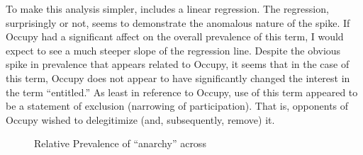 \documentclass[openany,twoside]{memoir}
\begin{document}
\begin{Spacing}{2}
To make this analysis simpler,  includes a linear regression.
The regression, surprisingly or not, seems to demonstrate the anomalous nature of the  spike.
If Occupy had a significant affect on the overall prevalence of this term, I would expect to see a much steeper slope of the regression line.
Despite the obvious spike in prevalence that appears related to Occupy, it seems that in the case of this term, Occupy does not appear to have significantly changed the interest in the term ``entitled.''
As least in reference to Occupy, use of this term appeared to be a statement of exclusion (narrowing of participation).
That is, opponents of Occupy wished to delegitimize (and, subsequently, remove) it.

\begin{figure}[h]
   \centering
   \caption{Relative Prevalence of ``anarchy'' across }
\end{figure}
\end{Spacing}
\end{document}
